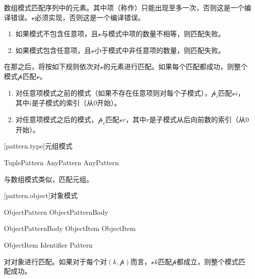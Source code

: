 \pnum
数组模式匹配序列中的元素。其中项（称作）只能出现至多一次，否则这是一个编译错误。$\mathcal{v}$必须实现，否则这是一个编译错误。

\begin{enumerate}
    \item 如果模式不包含任意项，且$\mathcal{v}$与模式中项的数量不相等，则匹配失败。
    \item 如果模式包含任意项，且$\mathcal{v}$小于模式中非任意项的数量，则匹配失败。
\end{enumerate}

\pnum
在那之后，将按如下规则依次对$\mathcal{v}$的元素进行匹配。如果每个匹配都成功，则整个模式$\mathcal{p}$匹配$\mathcal{v}$。

\begin{enumerate}
    \item 对任意项模式之前的模式（如果不存在任意项则对每个子模式），$\mathcal{p}_i$匹配$\mathcal{v}$\tcode{[}$i$\tcode{]}，其中$i$是子模式的索引（从0开始）。
    \item 对任意项模式之后的模式，$\mathcal{p}_r$匹配$\mathcal{v}$\tcode{[\$-}$r$\tcode{]}，其中$r$是子模式从后向前数的索引（从0开始）。
\end{enumerate}

[pattern.type]{元组模式}

\begin{bnf}{TuplePattern}
    \terminal{(} AnyPattern \bnflp\terminal{,} AnyPattern\bnfrp\bnfs\ \terminal{)}
\end{bnf}

\pnum
与数组模式类似，匹配元组。

[pattern.object]{对象模式}

\begin{bnf}{ObjectPattern}
    \terminal{\{} ObjectPatternBody \terminal{\}}
\end{bnf}

\begin{bnf}{ObjectPatternBody}
    ObjectItem \bnflp\terminal{,} ObjectItem\bnfrp\bnfs
\end{bnf}

\begin{bnf}{ObjectItem}
    Identifier \terminal{:} Pattern
\end{bnf}

\pnum
{}对对象进行匹配。如果对于每个对$(k, \mathcal{p})$而言，$\mathcal{v}$$k$匹配$\mathcal{p}$都成立，则整个模式匹配成功。

